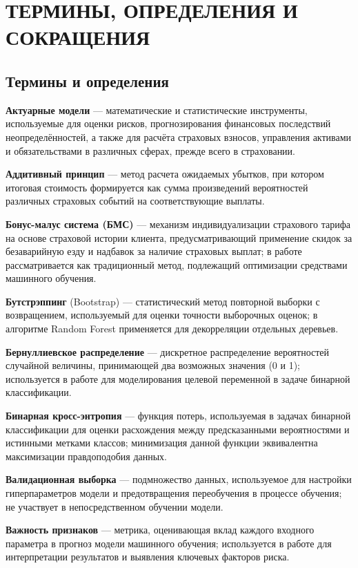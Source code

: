 \section*{ТЕРМИНЫ, ОПРЕДЕЛЕНИЯ И СОКРАЩЕНИЯ}

\subsection*{Термины и определения}

\textbf{Актуарные модели} --- математические и статистические инструменты, используемые для оценки рисков, прогнозирования финансовых последствий неопределённостей, а также для расчёта страховых взносов, управления активами и обязательствами в различных сферах, прежде всего в страховании.

\textbf{Аддитивный принцип} --- метод расчета ожидаемых убытков, при котором итоговая стоимость формируется как сумма произведений вероятностей различных страховых событий на соответствующие выплаты.

\textbf{Бонус-малус система (БМС)} --- механизм индивидуализации страхового тарифа на основе страховой истории клиента, предусматривающий применение скидок за безаварийную езду и надбавок за наличие страховых выплат; в работе рассматривается как традиционный метод, подлежащий оптимизации средствами машинного обучения.

\textbf{Бутстрэппинг} (Bootstrap) --- статистический метод повторной выборки с возвращением, используемый для оценки точности выборочных оценок; в алгоритме Random Forest применяется для декорреляции отдельных деревьев.

\textbf{Бернуллиевское распределение} --- дискретное распределение вероятностей случайной величины, принимающей два возможных значения (0 и 1); используется в работе для моделирования целевой переменной в задаче бинарной классификации.

\textbf{Бинарная кросс-энтропия} --- функция потерь, используемая в задачах бинарной классификации для оценки расхождения между предсказанными вероятностями и истинными метками классов; минимизация данной функции эквивалентна максимизации правдоподобия данных.

\textbf{Валидационная выборка} --- подмножество данных, используемое для настройки гиперпараметров модели и предотвращения переобучения в процессе обучения; не участвует в непосредственном обучении модели.

\textbf{Важность признаков} --- метрика, оценивающая вклад каждого входного параметра в прогноз модели машинного обучения; используется в работе для интерпретации результатов и выявления ключевых факторов риска.

